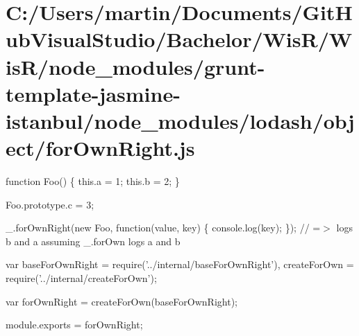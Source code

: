 \hypertarget{_c_1_2_users_2martin_2_documents_2_git_hub_visual_studio_2_bachelor_2_wis_r_2_wis_r_2node_moduleaa7a98eb702283f4fdc8f8cde8af00bd}{}\section{C\+:/\+Users/martin/\+Documents/\+Git\+Hub\+Visual\+Studio/\+Bachelor/\+Wis\+R/\+Wis\+R/node\+\_\+modules/grunt-\/template-\/jasmine-\/istanbul/node\+\_\+modules/lodash/object/for\+Own\+Right.\+js}
function Foo() \{ this.\+a = 1; this.\+b = 2; \}

Foo.\+prototype.\+c = 3;

\+\_\+.\+for\+Own\+Right(new Foo, function(value, key) \{ console.\+log(key); \}); // =$>$ logs \textquotesingle{}b\textquotesingle{} and \textquotesingle{}a\textquotesingle{} assuming {\ttfamily \+\_\+.\+for\+Own} logs \textquotesingle{}a\textquotesingle{} and \textquotesingle{}b\textquotesingle{}


\begin{DoxyCodeInclude}
var baseForOwnRight = require(\textcolor{stringliteral}{'../internal/baseForOwnRight'}),
    createForOwn = require(\textcolor{stringliteral}{'../internal/createForOwn'});

var forOwnRight = createForOwn(baseForOwnRight);

module.exports = forOwnRight;
\end{DoxyCodeInclude}
 
